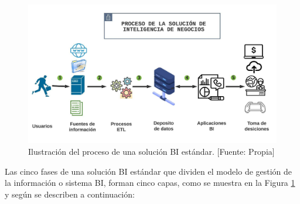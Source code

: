 \documentclass[11pt,titlepage]{report}
\begin{document}
\begin{figure}[h]
	\centering
	\includegraphics[width=1.05\linewidth]{Figuras/SoluBI}
	\caption{Ilustración del proceso de una solución BI estándar. [Fuente: Propia]}
	\label{fig: soluciónBI}
\end{figure}

Las cinco fases de una solución BI estándar que dividen el modelo de gestión de la información o sistema BI, forman cinco capas, como se muestra en la Figura \ref{fig: soluciónBI} y según \cite{lib02} se describen a continuación: 
\end{document}
